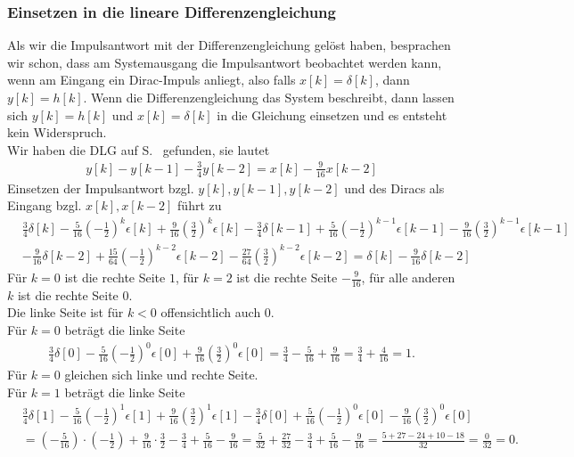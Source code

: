 \documentclass[11pt,a4paper,DIV=12]{scrartcl}
\begin{document}
\subsubsection*{Einsetzen in die lineare Differenzengleichung}
Als wir die Impulsantwort mit der Differenzengleichung gelöst haben, besprachen
wir schon, dass am Systemausgang die Impulsantwort beobachtet werden kann, wenn
am Eingang ein Dirac-Impuls anliegt, also falls $x[k]=\delta[k]$, dann
$y[k]=h[k]$.
%
Wenn die Differenzengleichung das System beschreibt, dann lassen sich
$y[k]=h[k]$ und $x[k]=\delta[k]$ in die Gleichung einsetzen und es entsteht
kein Widerspruch.\\
%
Wir haben die DLG auf S.~\pageref{pg:DGL} gefunden, sie lautet
%
\begin{gather}
	y[k]-y[k-1]-\frac{3}{4}y[k-2]=x[k]-\frac{9}{16}x[k-2]
\end{gather}
%
%
Einsetzen der Impulsantwort bzgl. $y[k], y[k-1], y[k-2]$ und des Diracs als Eingang
bzgl. $x[k], x[k-2]$ führt zu
%
\begin{align}
	&\frac{3}{4}\delta[k]-\frac{5}{16}\left(-\frac{1}{2}\right)^k\epsilon[k]+\frac{9}{16}\left(\frac{3}{2}\right)^k\epsilon[k]-\frac{3}{4}\delta[k-1]+\frac{5}{16}\left(-\frac{1}{2}\right)^{k-1}\epsilon[k-1]-\frac{9}{16}\left(\frac{3}{2}\right)^{k-1}\epsilon[k-1]\nonumber \\
	&-\frac{9}{16}\delta[k-2]+\frac{15}{64}\left(-\frac{1}{2}\right)^{k-2}\epsilon[k-2]-\frac{27}{64}\left(\frac{3}{2}\right)^{k-2}\epsilon[k-2]=\delta[k]-\frac{9}{16}\delta[k-2]
\end{align}
%
%
%
Für $k=0$ ist die rechte Seite $1$, für $k=2$ ist die rechte Seite
$-\frac{9}{16}$, für alle anderen $k$ ist die rechte Seite $0$.\\
%
Die linke Seite ist für $k<0$ offensichtlich auch 0.\\
%
Für $k=0$ beträgt die linke Seite
%
%
\begin{align}
	\frac{3}{4}\delta[0]-\frac{5}{16}\left(-\frac{1}{2}\right)^0\epsilon[0]+\frac{9}{16}\left(\frac{3}{2}\right)^0\epsilon[0]
	=\frac{3}{4}-\frac{5}{16}+\frac{9}{16}=\frac{3}{4}+\frac{4}{16}=1.
\end{align}
%
%
Für $k=0$ gleichen sich linke und rechte Seite.\\
%
Für $k=1$ beträgt die linke Seite
%
%
\begin{align}
	&\frac{3}{4}\delta[1]-\frac{5}{16}\left(-\frac{1}{2}\right)^1\epsilon[1]+\frac{9}{16}\left(\frac{3}{2}\right)^1\epsilon[1]-\frac{3}{4}\delta[0]+\frac{5}{16}\left(-\frac{1}{2}\right)^{0}\epsilon[0]-\frac{9}{16}\left(\frac{3}{2}\right)^{0}\epsilon[0]\nonumber\nonumber \\
	&=\left(-\frac{5}{16}\right)\cdot\left(-\frac{1}{2}\right)+\frac{9}{16}\cdot\frac{3}{2}-\frac{3}{4}+\frac{5}{16}-\frac{9}{16}=\frac{5}{32}+\frac{27}{32}-\frac{3}{4}+\frac{5}{16}-\frac{9}{16}=\frac{5+27-24+10-18}{32}=\frac{0}{32}=0.
\end{align}
\end{document}
